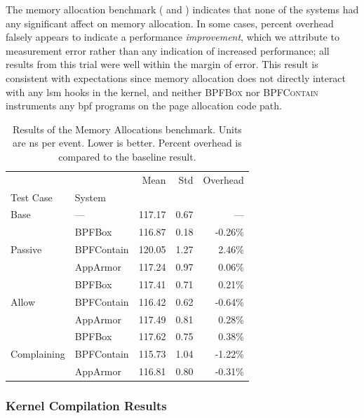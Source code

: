 \documentclass[
  fontsize=12pt,
  titlepage=firstiscover,
  paper=letter,
oneside,
  cleardoublepage=plain,
  parskip=half-,
  DIV=10,
  parindent,
  appendixprefix,
  chapterprefix,
  listof=totoc,
]{scrbook}
\newcommand{\bpfbox}{\textsc{BPFBox}}
\newcommand{\bpfcontain}{\textsc{BPFContain}}
\begin{document}
The memory allocation benchmark ( and
) indicates that none of the systems had any significant affect on
memory allocation. In some cases, percent overhead falsely appears to indicate
a performance \textit{improvement}, which we attribute to measurement error rather than
any indication of increased performance; all results from this trial were well within the
margin of error. This result is consistent with expectations since memory allocation does
not directly interact with any \gls{lsm} hooks in the kernel, and neither \bpfbox{} nor
\bpfcontain{} instruments any \gls{bpf} programs on the page allocation code path.

\begin{table}[ht!]
\centering
\footnotesize
\caption[Results of the Memory Allocations benchmark]{Results of the Memory Allocations benchmark. Units are ns per event. Lower is better. Percent overhead is compared to the baseline result.}
\label{tab:phoronix-memory-allocations}
\begin{tabular}{llrrr}
\toprule
            &          &    Mean &   Std & Overhead \\
Test Case & System &         &       &          \\
\midrule
Base & --- &  117.17 &  0.67 &      --- \\
\cline{1-5}
\multirow{3}{*}{Passive} & BPFBox &  116.87 &  0.18 &  -0.26\% \\
            & BPFContain &  120.05 &  1.27 &   2.46\% \\
            & AppArmor &  117.24 &  0.97 &   0.06\% \\
\cline{1-5}
\multirow{3}{*}{Allow} & BPFBox &  117.41 &  0.71 &   0.21\% \\
            & BPFContain &  116.42 &  0.62 &  -0.64\% \\
            & AppArmor &  117.49 &  0.81 &   0.28\% \\
\cline{1-5}
\multirow{3}{*}{Complaining} & BPFBox &  117.62 &  0.75 &   0.38\% \\
            & BPFContain &  115.73 &  1.04 &  -1.22\% \\
            & AppArmor &  116.81 &  0.80 &  -0.31\% \\
\bottomrule
\end{tabular}
\end{table}




\subsubsection{Kernel Compilation Results}
\end{document}
